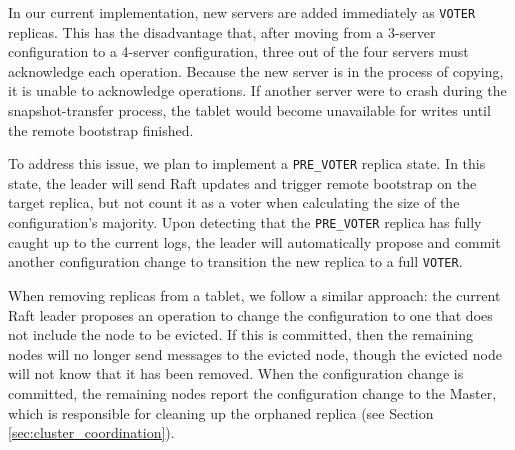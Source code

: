 \documentclass{vldb}
\begin{document}
In our current implementation, new servers are added immediately as {\tt VOTER} replicas.  This has
the disadvantage that, after moving from a 3-server configuration to a 4-server configuration, three
out of the four servers must acknowledge each operation. Because the new server is in the process of
copying, it is unable to acknowledge operations. If another server were to crash during the
snapshot-transfer process, the tablet would become unavailable for writes until the remote bootstrap
finished.

To address this issue, we plan to implement a {\tt PRE\_VOTER} replica state. In this
state, the leader will send Raft updates and trigger remote bootstrap on the
target replica, but not count it as a voter when calculating the size of the configuration's
majority. Upon detecting that the {\tt PRE\_VOTER} replica has fully caught up to
the current logs, the leader will automatically propose and commit another configuration change to
transition the new replica to a full {\tt VOTER}.

When removing replicas from a tablet, we follow a similar approach: the current Raft leader
proposes an operation to change the configuration to one that does not include the node
to be evicted. If this is committed, then the remaining nodes will no longer send messages
to the evicted node, though the evicted node will not know that it has been removed. When the
configuration change is committed, the remaining nodes report the configuration
change to the Master, which is responsible for cleaning up the orphaned replica (see
Section \ref{sec:cluster_coordination}).
\end{document}
